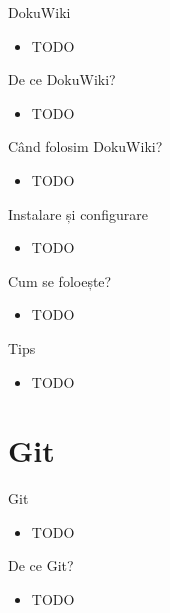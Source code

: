 \documentclass{beamer}
\begin{document}
\begin{frame}{DokuWiki}
  \begin{itemize}
    \item TODO
  \end{itemize}
\end{frame}

\begin{frame}{De ce DokuWiki?}
  \begin{itemize}
    \item TODO
  \end{itemize}
\end{frame}

\begin{frame}{Când folosim DokuWiki?}
  \begin{itemize}
    \item TODO
  \end{itemize}
\end{frame}

\begin{frame}{Instalare și configurare}
  \begin{itemize}
    \item TODO
  \end{itemize}
\end{frame}

\begin{frame}{Cum se foloește?}
  \begin{itemize}
    \item TODO
  \end{itemize}
\end{frame}

\begin{frame}{Tips}
  \begin{itemize}
    \item TODO
  \end{itemize}
\end{frame}

\section{Git}

\begin{frame}{Git}
  \begin{itemize}
    \item TODO
  \end{itemize}
\end{frame}

\begin{frame}{De ce Git?}
  \begin{itemize}
    \item TODO
  \end{itemize}
\end{frame}
\end{document}
